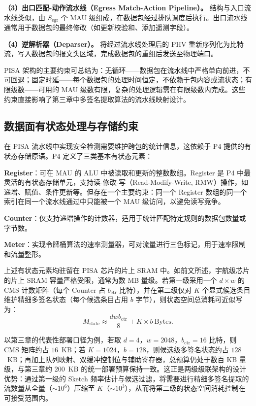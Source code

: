 \textbf{（3）出口匹配-动作流水线（Egress Match-Action Pipeline）。} 结构与入口流水线类似，由 $S_{\text{egr}}$ 个 MAU 级组成，在数据包经过排队调度后执行。出口流水线通常用于数据包的最终修改（如更新校验和、添加遥测字段）。

\textbf{（4）逆解析器（Deparser）。} 将经过流水线处理后的 PHV 重新序列化为比特流，写入数据包的报文头区域，完成数据包的重组后发送至物理端口。

PISA 架构的主要约束可总结为：无循环——数据包在流水线中严格单向前进，不可回退；固定时延——每个数据包的处理时间恒定，不依赖于包内容或流状态；有限级数——可用的 MAU 级数有限，复杂的处理逻辑需在有限级数内完成。这些约束直接影响了第三章中多签名提取算法的流水线映射设计。

\subsection{数据面有状态处理与存储约束}

在 PISA 流水线中实现安全检测需要维护跨包的统计信息，这依赖于 P4 提供的有状态存储原语。P4 定义了三类基本有状态元素：

\textbf{Register}：可在 MAU 的 ALU 中被读取和更新的整数数组。Register 是 P4 中最灵活的有状态存储单元，支持读-修改-写（Read-Modify-Write, RMW）操作，如递增、赋值、条件更新等。但存在一个主要约束：同一个 Register 数组的同一个索引在同一个流水线通过中只能被一个 MAU 级访问，以避免读写竞争。

\textbf{Counter}：仅支持递增操作的计数器，适用于统计匹配特定规则的数据包数量或字节数。

\textbf{Meter}：实现令牌桶算法的速率测量器，可对流量进行三色标记，用于速率限制和流量整形。

上述有状态元素均驻留在 PISA 芯片的片上 SRAM 中。如前文所述，宇航级芯片的片上 SRAM 容量严格受限，通常为数 MB 量级。若第一级采用一个 $d\times w$ 的 CMS 计数矩阵（每个 Counter 占 $b_{\text{ctr}}$ 比特），并在第二级仅对 $K$ 个显式候选条目维护精细多签名状态（每个候选条目占用 $b$ 字节），则状态空间总消耗可近似写为：
\begin{equation}
M_{\text{state}} \approx \frac{dwb_{\text{ctr}}}{8} + K \times b\ \text{Bytes}.
\end{equation}

以第三章的代表性部署口径为例，若取 $d=4，w=2048，b_{\text{ctr}}=16$ 比特，则 CMS 矩阵约占 $16$~KB；若 $K=1024，b=128$，则候选级多签名状态约占 $128$~KB；再加上队列映射、双缓冲控制位与辅助寄存器，总预算仍处于数百 KB 量级，与第三章约 $200$~KB 的统一部署预算保持一致。这正是两级级联架构的设计优势：通过第一级的 Sketch 频率估计与候选过滤，将需要进行精细多签名提取的流数量从全量（$\sim 10^6$）压缩至 $K$（$\sim 10^3$），从而将第二级的状态空间消耗控制在可接受范围内。

